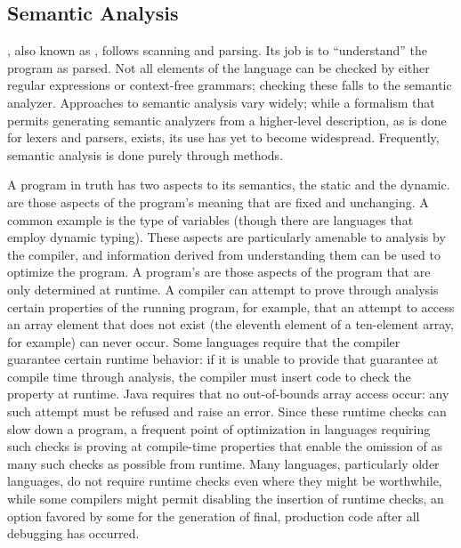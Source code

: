\subsection{Semantic Analysis}
, also known as , follows scanning and parsing. Its job is to ``understand'' the program as parsed. Not all elements of the language can be checked by either regular expressions or context-free grammars; checking these falls to the semantic analyzer. Approaches to semantic analysis vary widely; while a formalism that permits generating semantic analyzers from a higher-level description, as is done for lexers and parsers, exists, its use has yet to become widespread. Frequently, semantic analysis is done purely through  methods.

A program in truth has two aspects to its semantics, the static and the dynamic.  are those aspects of the program's meaning that are fixed and unchanging. A common example is the type of variables (though there are languages that employ dynamic typing). These aspects are particularly amenable to analysis by the compiler, and information derived from understanding them can be used to optimize the program. A program's  are those aspects of the program that are only determined at runtime. A compiler can attempt to prove through analysis certain properties of the running program, for example, that an attempt to access an array element that does not exist (the eleventh element of a ten-element array, for example) can never occur. Some languages require that the compiler guarantee certain runtime behavior: if it is unable to provide that guarantee at compile time through analysis, the compiler must insert code to check the property at runtime. Java requires that no out-of-bounds array access occur: any such attempt must be refused and raise an error. Since these runtime checks can slow down a program, a frequent point of optimization in languages requiring such checks is proving at compile-time properties that enable the omission of as many such checks as possible from runtime. Many languages, particularly older languages, do not require runtime checks even where they might be worthwhile, while some compilers might permit disabling the insertion of runtime checks, an option favored by some for the generation of final, production code after all debugging has occurred.

